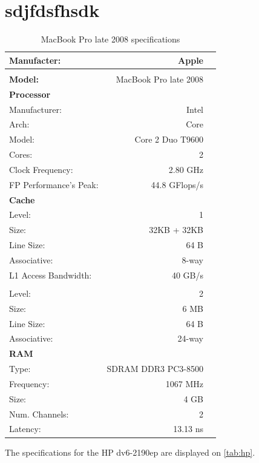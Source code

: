 \documentclass[a4paper,10pt,openright,openbib,twocolumn]{article}
\begin{document}
\section{sdjfdsfhsdk} %
\label{sec:sdjfdsfhsdk}

	

\tabcolsep=0.11cm
\begin{table}[!htp]
	\footnotesize
		\begin{tabular}{lrl}
			\hline 
			\textbf{Manufacter:} & Apple \\
			\hline \\
			\textbf{Model:} & MacBook Pro late 2008 \\
			\hline 
			\textbf{Processor} & & \\
			Manufacturer: & Intel & \\
			Arch: & Core & \\
			Model: & Core 2 Duo T9600 & \\
			Cores: & 2 & \\
			Clock Frequency: & 2.80 GHz & \\
			FP Performance's Peak: & 44.8 GFlops/s & \\
			\hline 
			\textbf{Cache} & & \\
			Level: & 1 & \\
			Size: & 32KB + 32KB & \\
			Line Size: & 64 B & \\
			Associative: & 8-way & \\			
			L1 Access Bandwidth: & 40 GB/s & \\
			\\
			Level: & 2 & \\
			Size: & 6 MB & \\
			Line Size: & 64 B & \\
			Associative: & 24-way & \\
			\hline 
			\textbf{RAM} \\
			Type: & SDRAM DDR3 PC3-8500 & \\
			Frequency: & 1067 MHz & \\
			Size: & 4 GB & \\
			Num. Channels: & 2 & \\
			Latency: & 13.13 ns & \\
		\end{tabular}
		\caption{MacBook Pro late 2008 specifications}
		\label{tab:mbp}
\end{table}
The specifications for the HP dv6-2190ep are displayed on \autoref{tab:hp}. \\
\end{document}
